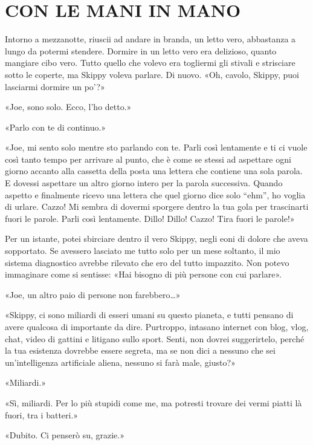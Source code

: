 \chapter{CON LE MANI IN MANO}\label{con-le-mani-in-mano}

\hfill\break

Intorno a mezzanotte, riuscii ad andare in branda, un letto vero,
abbastanza a lungo da potermi stendere. Dormire in un letto vero era
delizioso, quanto mangiare cibo vero. Tutto quello che volevo era
togliermi gli stivali e strisciare sotto le coperte, ma Skippy voleva
parlare. Di nuovo. «Oh, cavolo, Skippy, puoi lasciarmi dormire un po'?»

«Joe, sono solo. Ecco, l'ho detto.»

«Parlo con te di continuo.»

«Joe, mi sento solo mentre sto parlando con te. Parli così lentamente e
ti ci vuole così tanto tempo per arrivare al punto, che è come se stessi
ad aspettare ogni giorno accanto alla cassetta della posta una lettera
che contiene una sola parola. E dovessi aspettare un altro giorno intero
per la parola successiva. Quando aspetto e finalmente ricevo una lettera
che quel giorno dice solo ``ehm'', ho voglia di urlare. Cazzo! Mi sembra
di dovermi sporgere dentro la tua gola per trascinarti fuori le parole.
Parli così lentamente. Dillo! Dillo! Cazzo! Tira fuori le parole!»

Per un istante, potei sbirciare dentro il vero Skippy, negli eoni di
dolore che aveva sopportato. Se avessero lasciato me tutto solo per un
mese soltanto, il mio sistema diagnostico avrebbe rilevato che ero del
tutto impazzito. Non potevo immaginare come si sentisse: «Hai bisogno di
più persone con cui parlare».

«Joe, un altro paio di persone non farebbero\ldots»

«Skippy, ci sono miliardi di esseri umani su questo pianeta, e tutti
pensano di avere qualcosa di importante da dire. Purtroppo, intasano
internet con blog, vlog, chat, video di gattini e litigano sullo sport.
Senti, non dovrei suggerirtelo, perché la tua esistenza dovrebbe essere
segreta, ma se non dici a nessuno che sei un'intelligenza artificiale
aliena, nessuno si farà male, giusto?»

«Miliardi.»

«Sì, miliardi. Per lo più stupidi come me, ma potresti trovare dei vermi
piatti là fuori, tra i batteri.»

«Dubito. Ci penserò su, grazie.»

